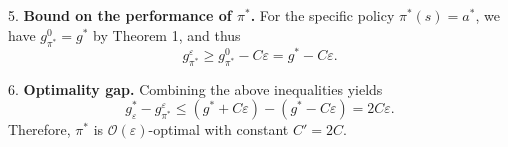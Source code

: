 \documentclass{article}
\begin{document}
5. {\bf Bound on the performance of $\pi^*$.}  
For the specific policy $\pi^*(s) = a^*$, we have $g_{\pi^*}^0 = g^*$ by Theorem 1, and thus
\[
g_{\pi^*}^\varepsilon \ge g_{\pi^*}^0 - C \varepsilon = g^* - C \varepsilon.
\]

6. {\bf Optimality gap.}  
Combining the above inequalities yields
\[
g_\varepsilon^* - g_{\pi^*}^\varepsilon \le (g^* + C \varepsilon) - (g^* - C \varepsilon) = 2C \varepsilon.
\]
Therefore, $\pi^*$ is $\mathcal{O}(\varepsilon)$-optimal with constant $C' = 2C$. 



  
\end{document}
